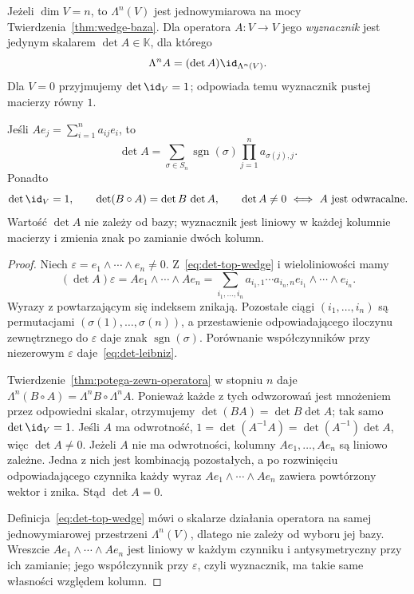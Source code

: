 \begin{definicja}
\label{def:det-wedge}
Jeżeli $\dim V=n$, to $\Lambda^n(V)$ jest jednowymiarowa
na mocy Twierdzenia~\ref{thm:wedge-baza}. Dla operatora
$A\colon V\to V$ jego \emph{wyznacznik} jest jedynym skalarem
$\det A\in\mathbb K$, dla którego
\begin{equation}\label{eq:det-top-wedge}
 \Lambda^n A=(\det A)\id_{\Lambda^n(V)}.
\end{equation}
Dla $V=0$ przyjmujemy $\det\id_V=1$; odpowiada temu
wyznacznik pustej macierzy równy $1$.
\end{definicja}

\begin{twierdzenie}
\label{thm:det-wlasnosci}
Jeśli $Ae_j=\sum_{i=1}^n a_{ij}e_i$, to
\begin{equation}\label{eq:det-leibniz}
 \det A=\sum_{\sigma\in S_n}\operatorname{sgn}(\sigma)
 \prod_{j=1}^n a_{\sigma(j),j}.
\end{equation}
Ponadto
\[
 \det\id_V=1,\qquad \det(B\circ A)=\det B\,\det A,
 \qquad \det A\ne0\ \Longleftrightarrow\ A\text{ jest odwracalne}.
\]
Wartość $\det A$ nie zależy od bazy; wyznacznik jest
liniowy w każdej kolumnie macierzy i zmienia znak po
zamianie dwóch kolumn.
\end{twierdzenie}
\begin{proof}
Niech $\varepsilon=e_1\wedge\cdots\wedge e_n\ne0$.
Z~\eqref{eq:det-top-wedge} i wieloliniowości mamy
\[
 (\det A)\varepsilon
 =Ae_1\wedge\cdots\wedge Ae_n
 =\sum_{i_1,\ldots,i_n}
   a_{i_1,1}\cdots a_{i_n,n}
   e_{i_1}\wedge\cdots\wedge e_{i_n}.
\]
Wyrazy z powtarzającym się indeksem znikają. Pozostałe
ciągi $(i_1,\ldots,i_n)$ są permutacjami
$(\sigma(1),\ldots,\sigma(n))$, a przestawienie odpowiadającego
iloczynu zewnętrznego do $\varepsilon$ daje znak
$\operatorname{sgn}(\sigma)$. Porównanie współczynników
przy niezerowym $\varepsilon$ daje~\eqref{eq:det-leibniz}.

Twierdzenie~\ref{thm:potega-zewn-operatora} w stopniu $n$
daje $\Lambda^n(B\circ A)=\Lambda^n B\circ\Lambda^n A$.
Ponieważ każde z tych odwzorowań jest mnożeniem przez odpowiedni
skalar, otrzymujemy $\det(BA)=\det B\det A$;
tak samo $\det\id_V=1$. Jeśli $A$ ma odwrotność,
$1=\det(A^{-1}A)=\det(A^{-1})\det A$, więc $\det A\ne0$.
Jeżeli $A$ nie ma odwrotności, kolumny $Ae_1,\ldots,Ae_n$
są liniowo zależne. Jedna z nich jest kombinacją pozostałych,
a po rozwinięciu odpowiadającego czynnika każdy wyraz
$Ae_1\wedge\cdots\wedge Ae_n$ zawiera powtórzony wektor
i znika. Stąd $\det A=0$.

Definicja~\eqref{eq:det-top-wedge} mówi o skalarze działania
operatora na samej jednowymiarowej przestrzeni
$\Lambda^n(V)$, dlatego nie zależy od wyboru jej bazy.
Wreszcie $Ae_1\wedge\cdots\wedge Ae_n$ jest liniowy
w każdym czynniku i antysymetryczny przy ich zamianie;
jego współczynnik przy $\varepsilon$, czyli wyznacznik,
ma takie same własności względem kolumn.
\end{proof}

